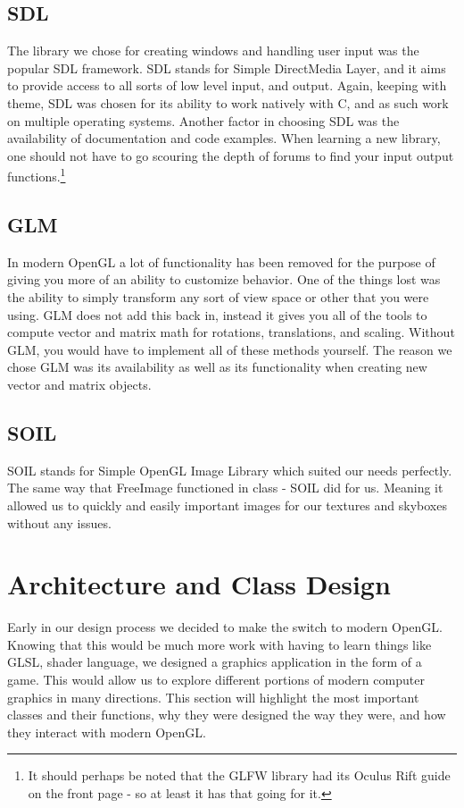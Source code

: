 \documentclass[paper=a4, fontsize=11pt]{scrartcl}
\numberwithin{equation}{section}		%
\numberwithin{figure}{section}			%
\numberwithin{table}{section}				%
\begin{document}
\subsection{SDL}
The library we chose for creating windows and handling user input was the popular SDL framework. SDL stands for Simple DirectMedia Layer, and it aims to provide access to all sorts of low level input, and output. Again, keeping with theme, SDL was chosen for its ability to work natively with C, and as such work on multiple operating systems. Another factor in choosing SDL was the availability of documentation and code examples. When learning a new library, one should not have to go scouring the depth of forums to find your input output functions.\footnote{It should perhaps be noted that the GLFW library had its Oculus Rift guide on the front page - so at least it has that going for it.}
\subsection{GLM}
In modern OpenGL a lot of functionality has been removed for the purpose of giving you more of an ability to customize behavior. One of the things lost was the ability to simply transform any sort of view space or other that you were using. GLM does not add this back in, instead it gives you all of the tools to compute vector and matrix math for rotations, translations, and scaling. Without GLM, you would have to implement all of these methods yourself. The reason we chose GLM was its availability as well as its functionality when creating new vector and matrix objects.
\subsection{SOIL}
SOIL stands for Simple OpenGL Image Library which suited our needs perfectly. The same way that FreeImage functioned in class - SOIL did for us. Meaning it allowed us to quickly and easily important images for our textures and skyboxes without any issues.

\section{Architecture and Class Design}
Early in our design process we decided to make the switch to modern OpenGL. Knowing that this would be much more work with having to learn things like GLSL, shader language, we designed a graphics application in the form of a game. This would allow us to explore different portions of modern computer graphics in many directions. This section will highlight the most important classes and their functions, why they were designed the way they were, and how they interact with modern OpenGL.
\end{document}
